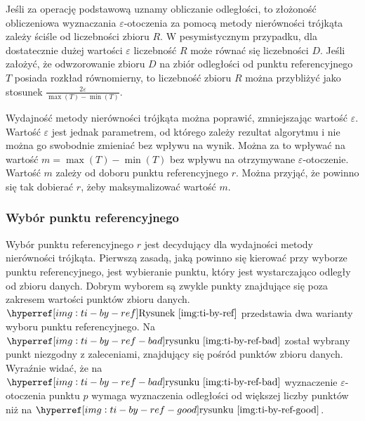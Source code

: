 Jeśli za operację podstawową uznamy obliczanie odległości, to złożoność obliczeniowa wyznaczania $ \varepsilon $-otoczenia za pomocą metody nierówności trójkąta zależy ściśle od liczebności zbioru $ R $. W pesymistycznym przypadku, dla dostatecznie dużej wartości $ \varepsilon $ liczebność $ R $ może równać się liczebności $ D $. Jeśli założyć, że odwzorowanie zbioru $ D $ na zbiór odległości od punktu referencyjnego $ T $ posiada rozkład równomierny, to liczebność zbioru $ R $ można przybliżyć jako stosunek $ \frac{2\varepsilon}{\max(T)-\min(T)} $. 

Wydajność metody nierówności trójkąta można poprawić, zmniejszając wartość $ \varepsilon $. Wartość $ \varepsilon $ jest jednak parametrem, od którego zależy rezultat algorytmu i nie można go swobodnie zmieniać bez wpływu na wynik. Można za to wpływać na wartość $ m=\max(T)-\min(T) $ bez wpływu na otrzymywane $ \varepsilon $-otoczenie. Wartość $ m $ zależy od doboru punktu referencyjnego $ r $. Można przyjąć, że powinno się tak dobierać $ r $, żeby maksymalizować wartość $ m $. 

\subsubsection{Wybór punktu referencyjnego}
Wybór punktu referencyjnego  $ r $ jest decydujący dla wydajności metody nierówności trójkąta. Pierwszą zasadą, jaką powinno się kierować przy wyborze punktu referencyjnego, jest wybieranie punktu, który jest wystarczająco odległy od zbioru danych. Dobrym wyborem są zwykle punkty znajdujące się poza zakresem wartości punktów zbioru danych. $ \myhyperref{img:ti-by-ref}{Rysunek} $ przedstawia dwa warianty wyboru punktu referencyjnego. Na $ \myhyperref{img:ti-by-ref-bad}{rysunku} $ został wybrany punkt niezgodny z zaleceniami, znajdujący się pośród punktów zbioru danych. Wyraźnie widać, że na $ \myhyperref{img:ti-by-ref-bad}{rysunku} $ wyznaczenie $ \varepsilon $-otoczenia punktu $ p $ wymaga wyznaczenia odległości od większej liczby punktów niż na $ \myhyperref{img:ti-by-ref-good}{rysunku} $.

